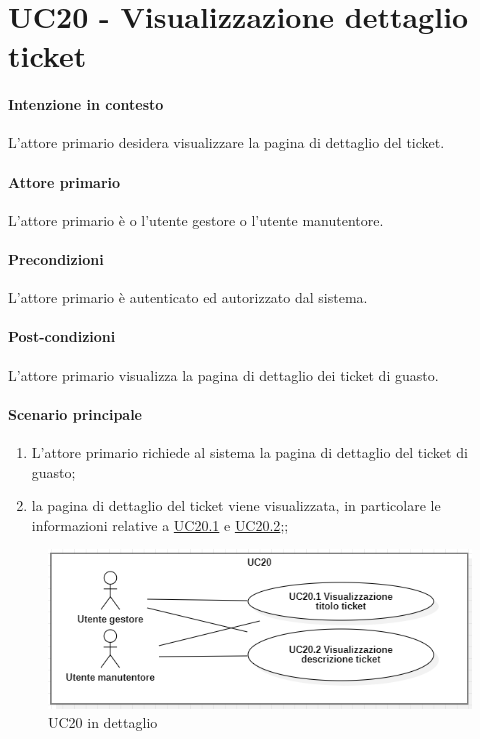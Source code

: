 \section{UC20 - Visualizzazione dettaglio ticket}\label{uc:20}
\paragraph{Intenzione in contesto} L'attore primario desidera visualizzare la pagina di dettaglio del ticket.

\paragraph{Attore primario} L'attore primario è o l'utente gestore o l'utente manutentore.
\paragraph{Precondizioni} L'attore primario è autenticato ed autorizzato dal sistema.
\paragraph{Post-condizioni} L'attore primario visualizza la pagina di dettaglio dei ticket di guasto.
\paragraph{Scenario principale}
\begin{enumerate}
    \item L'attore primario richiede al sistema la pagina di dettaglio del ticket di guasto;
    \item la pagina di dettaglio del ticket viene visualizzata, in particolare le informazioni relative a \hyperref[uc:20.1]{UC20.1} e \hyperref[uc:20.2]{UC20.2};;
\end{enumerate}

\begin{figure}[h]
    \includegraphics[width=\textwidth]{contenuti/img/casi_uso_grafici-uc20.png}
    \caption{UC20 in dettaglio}
    \label{fig:uc20}
\end{figure}


